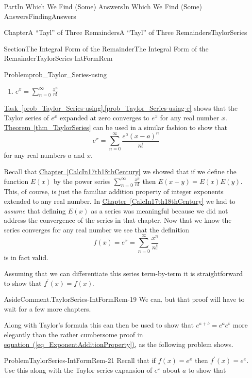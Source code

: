 \documentclass[oneside,10pt,]{book}
\newcommand{\xreffont}{\relax}
\numberwithin{equation}{part}
\begin{document}
\begin{partptx}{Part}{In Which We Find (Some) Answers}{}{In Which We Find (Some) Answers}{}{}{FindingAnswers}
\begin{chapterptx}{Chapter}{A ``Tayl'' of Three Remainders}{}{A ``Tayl'' of Three Remainders}{}{}{TaylorSeries}
\begin{sectionptx}{Section}{The Integral Form of the Remainder}{}{The Integral Form of the Remainder}{}{}{TaylorSeries-IntFormRem}
\begin{problem}{Problem}{}{prob_Taylor_Series-using}
\begin{enumerate}[font=\bfseries,label=(\alph*),ref=\alph*]
\item\label{prob_Taylor_Series-using-c}\(\displaystyle e^x=\sum_{n=0}^\infty\frac{x^n}{n!}\)%
\end{enumerate}%
\end{problem}
\hyperref[prob_Taylor_Series-using-c]{Task~{\xreffont\ref{prob_Taylor_Series-using}}.{\xreffont\ref{prob_Taylor_Series-using-c}}} shows that the Taylor series of \(e^x\) expanded at zero converges to \(e^x\) for any real number \(x\). \hyperref[thm_TaylorSeries]{Theorem~{\xreffont\ref{thm_TaylorSeries}}} can be used in a similar fashion to show that%
\begin{equation*}
e^x=\sum_{n=0}^\infty\frac{e^a(x-a)^n}{n!}
\end{equation*}
for any real numbers \(a\) and \(x\).%
\par
Recall that \hyperref[CalcIn17th18thCentury]{Chapter~{\xreffont\ref{CalcIn17th18thCentury}}} we showed that if we define the function \(E(x)\) by the power series \(\sum_{n=0}^\infty\frac{x^n}{n!}\) then \(E(x+y)=E(x)E(y)\). This, of course, is just the familiar addition property of integer exponents extended to any real number. In \hyperref[CalcIn17th18thCentury]{Chapter~{\xreffont\ref{CalcIn17th18thCentury}}} we had to \emph{assume} that defining \(E(x)\) as a series was meaningful because we did not address the convergence of the series in that chapter. Now that we know the series converges for any real number we see that the definition%
\begin{equation*}
f(x) = e^x = \sum_{n=0}^\infty\frac{x^n}{n!}
\end{equation*}
is in fact valid.%
\par
Assuming that we can differentiate this series term-by-term it is straightforward to show that \(f^\prime(x) = f(x)\).%
\begin{aside}{Aside}{Comment.}{TaylorSeries-IntFormRem-19}%
We can, but that proof will have to wait for a few more chapters.%
\end{aside}
Along with Taylor's formula this can then be used to show that \(e^{a+b}=e^ae^b\) more elegantly than the rather cumbersome proof in \hyperref[eq_ExponentAdditionProperty]{equation~({\xreffont\ref{eq_ExponentAdditionProperty}})}, as the following problem shows.%
\begin{problem}{Problem}{}{TaylorSeries-IntFormRem-21}%
 Recall that if \(f(x)=e^x\) then \(f^\prime(x) = e^x\). Use this along with the Taylor series expansion of \(e^x\) about \(a\) to show that%
\begin{equation*}

\end{equation*}
\end{problem}
\end{sectionptx}
\end{chapterptx}
\end{partptx}
\end{document}
